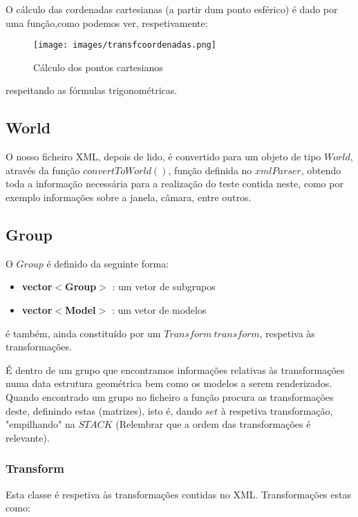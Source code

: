 \documentclass{article}
\begin{document}
O cálculo das cordenadas cartesianas (a partir dum ponto esférico) é dado por uma função,como podemos ver, respetivamente:

\begin{figure}[h]
    \centering
    \texttt{[image: images/transfcoordenadas.png]}
    \caption{Cálculo dos pontos cartesianos}
    \label{fig:exemplo}
\end{figure}

respeitando as fórmulas trigonométricas.

\subsection{World}

O nosso ficheiro XML, depois de lido, é convertido para um objeto de tipo $World$, através da função $convertToWorld()$, função definida no $xmlParser$, obtendo toda a informação necessária para a realização do teste contida neste, como por exemplo informações sobre a janela, câmara, entre outros.

\newpage

\subsection{Group}

O $Group$ é definido da seguinte forma:
\begin{itemize}
    \item \textbf{vector$<$Group$>$} : um vetor de subgrupos 
    \item \textbf{vector$<$Model$>$} : um vetor de modelos
\end{itemize}

é também, ainda constituído por um $Transform \ transform$, respetiva às transformações.

É dentro de um grupo que encontramos informações relativas às transformações numa data estrutura geométrica bem como os modelos a serem renderizados.
Quando encontrado um grupo no ficheiro a função procura as transformações deste, definindo estas (matrizes), isto é, dando $set$ à respetiva transformação, "empilhando" na $STACK$ (Relembrar que a ordem das transformações é relevante).

\subsubsection{Transform}
Esta classe é respetiva às transformações contidas no XML. Transformações estas como:
\end{document}
